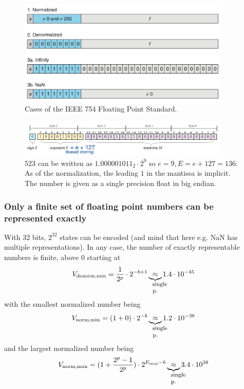 \begin{figure}[!htb]
    \centering
    \includegraphics[width=0.9\textwidth]{figures/float_cases.png}\hfill
    \caption{Cases of the IEEE 754 Floating Point Standard.}
    \label{fig:float_cases}
\end{figure}

\begin{figure}[!htb]
    \centering
    \includegraphics[width=0.9\textwidth]{figures/523float.png}\hfill
    \caption{523 can be written as $1.000001011_2 \cdot 2^9$ so $e=9, E = e + 127 = 136$. As of the normalization, the leading $1$ in the mantissa is implicit. The number is given as a single precision float in big endian.}
    \label{fig:523float}
\end{figure}

\subsubsection{Only a finite set of floating point numbers can be represented exactly}
With 32 bits, $2^{32}$ states can be encoded (and mind that here e.g. NaN has multiple representations). In any case,
the number of exactly representable numbers is finite, above $0$ starting at
\begin{equation}
    V_{\text{denorm,min}} = \frac{1}{2^p} \cdot 2^{-b+1} \explain{\approx}{single p.} 1.4 \cdot 10^{-45}
\end{equation}
with the smallest normalized number being
\begin{equation}
    V_{\text{norm,min}} = (1 + 0) \cdot 2^{-b} \explain{\approx}{single p.} 1.2 \cdot 10^{-38}
\end{equation}
and the largest normalized number being
\begin{equation}
    V_{\text{norm,max}} = (1 + \frac{2^p - 1}{2^p}) \cdot 2^{E_{\text{max}} - b} \explain{\approx}{single p.} 3.4 \cdot 10^{38}
\end{equation}

